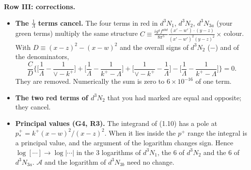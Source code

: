 \documentclass[9pt]{article}
\numberwithin{equation}{section}
\begin{document}
\begingroup\color{blue}\noindent\textbf{Row III: corrections.}
\begin{itemize}
\item \textbf{The $\frac{1}{\Lambda}$ terms cancel.} The four terms in red in $d^{3}N_{1}$, $d^{3}N_{2}$, $d^{3}N_{3a}$ (your green terms) multiply the same structure $C\equiv\frac{ig^{4}f^{abd}}{8\pi^{5}}\frac{(x'-w')\cdot(y-z)}{(x'-w')^{2}(y-z)^{2}}\times$\,colour. With $D\equiv(x-z)^{2}-(x-w)^{2}$ and the overall signs of $d^{3}N_{2}$ ($-$) and of the denominators,
\begin{equation*}
\frac{C}{D}\Big\{\Big[\frac{1}{\Lambda}-\frac{1}{\vee-k^{+}}\Big]+\Big[\frac{1}{\Lambda}-\frac{1}{k^{+}-\Lambda}\Big]+\Big[\frac{1}{\vee-k^{+}}-\frac{1}{\Lambda}\Big]-\Big[\frac{1}{\Lambda}-\frac{1}{k^{+}-\Lambda}\Big]\Big\}=0 .
\end{equation*}
They are removed. Numerically the sum is zero to $6\times10^{-16}$ of one term.
\item \textbf{The two red terms of $d^{3}N_{2}$} that you had marked are equal and opposite; they cancel.
\item \textbf{Principal values (G4, R3).} The integrand of (1.10) has a pole at $p^{+}_{*}=k^{+}(x-w)^{2}/(x-z)^{2}$. When it lies inside the $p^{+}$ range the integral is a principal value, and the argument of the logarithm changes sign. Hence $\log[\cdots]\to\log|\cdots|$ in the 3 logarithms of $d^{3}N_{1}$, the 6 of $d^{3}N_{2}$ and the 6 of $d^{3}N_{3a}$. $\mathcal{A}$ and the logarithm of $d^{3}N_{3b}$ need no change.
\end{itemize}\par\endgroup
\end{document}
